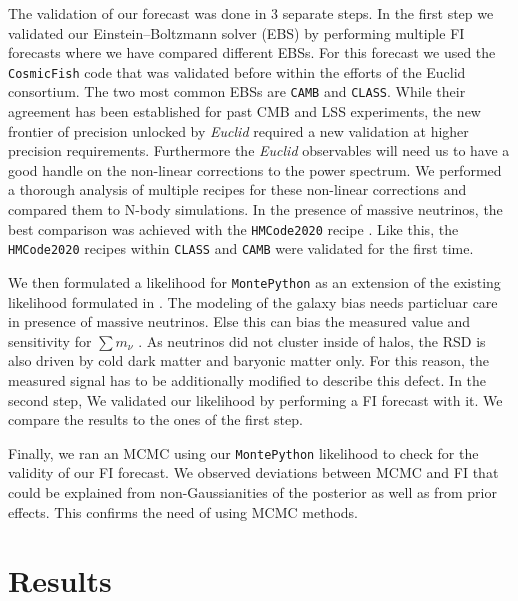 \documentclass[a4paper,11pt]{article}
\newcommand{\euclid}{\textit{Euclid}\xspace}
\newcommand{\summnu}{\sum m_\nu}
\newcommand{\camb}{\texttt{CAMB}\xspace}
\newcommand{\class}{\texttt{CLASS}\xspace}
\newcommand{\montepython}{\texttt{MontePython}\xspace}
\newcommand{\cosmicfish}{\texttt{CosmicFish}\xspace}
\begin{document}
The validation of our forecast was done in 3 separate steps. In the first step we validated our Einstein--Boltzmann solver (EBS) by performing multiple FI forecasts where we have compared different EBSs. For this forecast we used the \cosmicfish code that was validated before within the efforts of the Euclid consortium\cite{ISTF2020}. The two most common EBSs are \camb\cite{2011ascl.soft02026L} and \class\cite{Diego_Blas_2011}. While their agreement has been established for past CMB and LSS experiments, the new frontier of precision unlocked by \euclid required a new validation at higher precision requirements. Furthermore the \euclid observables will need us to have a good handle on the non-linear corrections to the power spectrum. We performed a thorough analysis of multiple recipes for these non-linear corrections and compared them to N-body simulations. In the presence of massive neutrinos, the best comparison was achieved with the \texttt{HMCode2020} recipe \cite{Mead_2021}. Like this, the \texttt{HMCode2020} recipes within \class and \camb were validated for the first time.

We then formulated a likelihood for \montepython\cite{Audren:2012wb} as an extension of the existing likelihood formulated in \cite{casas2023euclidvalidationmontepythonforecasting}. The modeling of the galaxy bias needs particluar care in presence of massive neutrinos. Else this can bias the measured value and sensitivity for $\summnu$ \cite{Vagnozzi_2018}. As neutrinos did not cluster inside of halos, the RSD is also driven by cold dark matter and baryonic matter only\cite{Villaescusa_Navarro_2018}. For this reason, the measured signal has to be additionally modified to describe this defect. In the second step, We validated our likelihood by performing a FI forecast with it. We compare the results to the ones of the first step.

Finally, we ran an MCMC using our \montepython likelihood to check for the validity of our FI forecast. We observed deviations between MCMC and FI that could be explained from non-Gaussianities of the posterior as well as from prior effects. This confirms the need of using MCMC methods. 

\section{Results}
\end{document}
